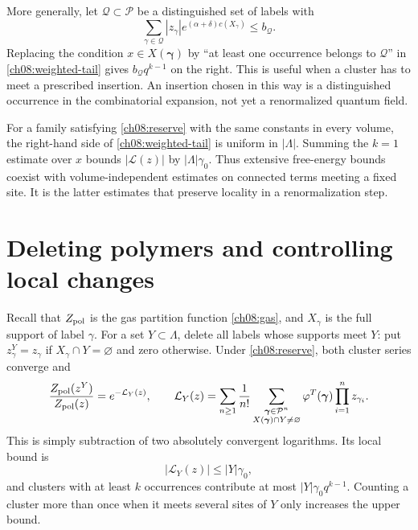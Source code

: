 More generally, let $\mathcal Q\subset\mathcal P$ be a distinguished
set of labels with
\[
 \sum_{\gamma\in\mathcal Q}|z_\gamma|
                  e^{(\alpha+\delta)c(X_\gamma)}\le b_{\mathcal Q}.
\]
Replacing the condition $x\in X(\boldsymbol\gamma)$ by
``at least one occurrence belongs to $\mathcal Q$'' in
\eqref{ch08:weighted-tail} gives $b_{\mathcal Q}q^{k-1}$ on the right.
This is useful when a cluster has to meet a prescribed insertion.
An insertion chosen in this way is a distinguished occurrence in the
combinatorial expansion, not yet a renormalized quantum field.

For a family satisfying \eqref{ch08:reserve} with the same constants in
every volume, the right-hand side of \eqref{ch08:weighted-tail} is uniform
in $|\Lambda|$. Summing the $k=1$ estimate over $x$ bounds $|\mathcal L(z)|$ by
$|\Lambda|\gamma_0$. Thus extensive free-energy bounds coexist with
volume-independent estimates on connected terms meeting a fixed site.
It is the latter estimates that preserve locality in a renormalization
step.

\section{Deleting polymers and controlling local changes}
\label{ch08:deletion}

Recall that $Z_{\rm pol}$ is the gas partition function
\eqref{ch08:gas}, and $X_\gamma$ is the full support of label $\gamma$.
For a set $Y\subset\Lambda$, delete all labels whose supports meet $Y$:
put $z^Y_\gamma=z_\gamma$ if $X_\gamma\cap Y=\varnothing$ and zero
otherwise. Under \eqref{ch08:reserve}, both cluster series converge and
\begin{equation}\label{ch08:deletion-identity}
 \frac{Z_{\rm pol}(z^Y)}{Z_{\rm pol}(z)}
  =e^{-\mathcal L_Y(z)},\qquad
 \mathcal L_Y(z)=\sum_{n\ge1}\frac1{n!}
 \sum_{\substack{\boldsymbol\gamma\in\mathcal P^n\\
 X(\boldsymbol\gamma)\cap Y\ne\varnothing}}
 \varphi^T(\boldsymbol\gamma)\prod_{i=1}^n z_{\gamma_i}.
\end{equation}
This is simply subtraction of two absolutely convergent logarithms.
Its local bound is
\begin{equation}\label{ch08:deletion-bound}
 |\mathcal L_Y(z)|\le |Y|\gamma_0,
\end{equation}
and clusters with at least $k$ occurrences contribute at most
$|Y|\gamma_0q^{k-1}$. Counting a cluster more than once when it meets
several sites of $Y$ only increases the upper bound.

